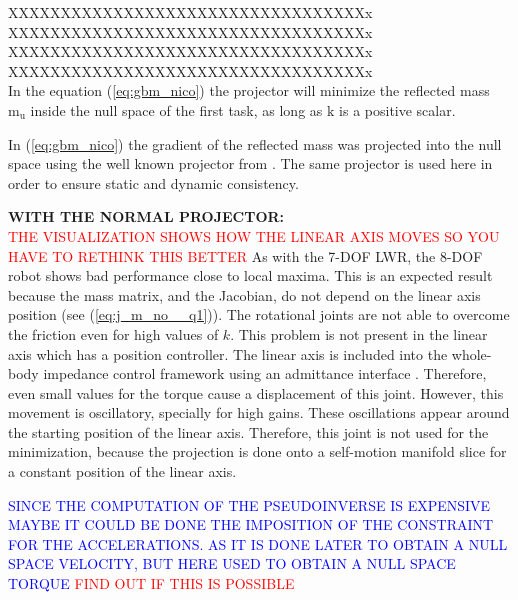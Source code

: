 XXXXXXXXXXXXXXXXXXXXXXXXXXXXXXXXXXx \\
XXXXXXXXXXXXXXXXXXXXXXXXXXXXXXXXXXx \\
XXXXXXXXXXXXXXXXXXXXXXXXXXXXXXXXXXx \\
XXXXXXXXXXXXXXXXXXXXXXXXXXXXXXXXXXx \\


In the equation (\ref{eq:gbm_nico}) the  projector will minimize the reflected mass $\mathrm{m_u}$ inside the null space of the first task, as long as $\mathrm{k}$ is a positive scalar. 

In (\ref{eq:gbm_nico}) the gradient of the reflected mass was projected into the null space using the well known projector from \cite{khatib1995}. The same projector is used here in order to ensure static and dynamic consistency.  



%
\textbf{WITH THE NORMAL PROJECTOR:}\\
\textcolor{red}{THE VISUALIZATION SHOWS HOW THE LINEAR AXIS MOVES SO YOU HAVE TO RETHINK THIS BETTER}
 As with the 7-DOF LWR, the 8-DOF robot shows bad performance close to local maxima. This is an expected result because the mass matrix, and the Jacobian, do not depend on the linear axis position (see (\ref{eq:j_m_no__q1})). The rotational joints are not able to overcome the friction even for high values of $k$. This problem is not present in the linear axis which has a position controller. The linear axis is included into the whole-body impedance control framework using an admittance interface \cite{whole_body_imp}. Therefore, even small values for the torque cause a displacement of this joint.
  However, this movement is oscillatory, specially for high gains. These oscillations appear around the starting position of the linear axis. Therefore, this joint is not used for the minimization, because the projection is done onto a self-motion manifold slice for a constant position of the linear axis.
% 

\textcolor{blue}{ SINCE THE COMPUTATION OF THE PSEUDOINVERSE IS EXPENSIVE MAYBE IT COULD BE DONE THE IMPOSITION OF THE CONSTRAINT FOR THE ACCELERATIONS. AS IT IS DONE LATER TO OBTAIN A NULL SPACE VELOCITY, BUT HERE USED TO OBTAIN A NULL SPACE TORQUE} \textcolor{red}{FIND OUT IF THIS IS POSSIBLE
}



